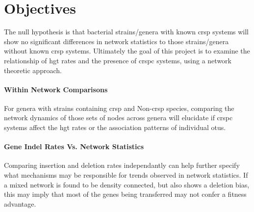 \section{Objectives}
The null hypothesis is that bacterial strains/genera with known \ac{crsp} systems will show no significant differences in network statistics to those strains/genera without known \ac{crsp} systems.
Ultimately the goal of this project is to examine the relationship of \ac{hgt} rates and the presence of \ac{crspc} systems, using a network theoretic approach.
\paragraph*{Within Network Comparisons}%
For genera with strains containing \ac{crsp} and Non-\ac{crsp} species, comparing the network dynamics of those sets of nodes across genera will elucidate if \ac{crspc} systems affect the \ac{hgt} rates or the association patterns of individual \ac{otu}s.
\paragraph*{Gene Indel Rates Vs. Network Statistics}%
Comparing insertion and  deletion rates independantly can help further specify what mechanisms may be responsible for trends observed in network statistics.
If a mixed network is found to be density connected, but also shows a deletion bias, this may imply that most of the genes being transferred may not confer a fitness advantage.
